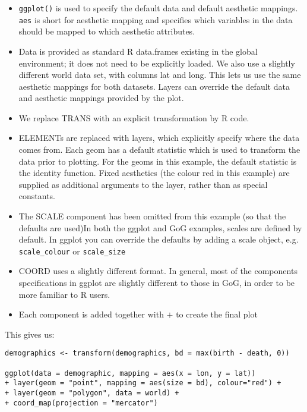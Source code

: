 \begin{itemize}
	
	\item {\tt ggplot()} is used to specify the default data and default aesthetic mappings.  {\tt aes} is short for aesthetic mapping and specifies which variables in the data should be mapped to which aesthetic attributes.
	
	\item Data is provided as standard R data.frames existing in the global environment; it does not need to be explicitly loaded.  We also use a slightly different world data set, with columns lat and long.  This lets us use the same aesthetic mappings for both datasets. Layers can override the default data and aesthetic mappings provided by the plot. 
	
	\item We replace {\sf TRANS} with an explicit transformation by R code.

	\item {\sf ELEMENT}s are replaced with layers, which explicitly specify where the data comes from.  Each geom has a default statistic which is used to transform the data prior to plotting.  For the geoms in this example, the default statistic is the identity function.  Fixed aesthetics (the colour red in this example) are supplied as additional arguments to the layer, rather than as special constants.

	\item The {\sf SCALE} component has been omitted from this example (so that the defaults are used)In both the ggplot and GoG examples, scales are defined by default.  In ggplot you can override the defaults by adding a scale object, e.g. {\tt scale\_colour} or {\tt scale\_size}

	\item {\sf COORD} uses a slightly different format.  In general, most of the components specifications in ggplot are slightly different to those in GoG, in order to be more familiar to R users.

	\item Each component is added together with $+$ to create the final plot

\end{itemize}

This gives us:

\begin{verbatim}
demographics <- transform(demographics, bd = max(birth - death, 0))

ggplot(data = demographic, mapping = aes(x = lon, y = lat)) 
+ layer(geom = "point", mapping = aes(size = bd), colour="red") +
+ layer(geom = "polygon", data = world) +
+ coord_map(projection = "mercator")
\end{verbatim}

